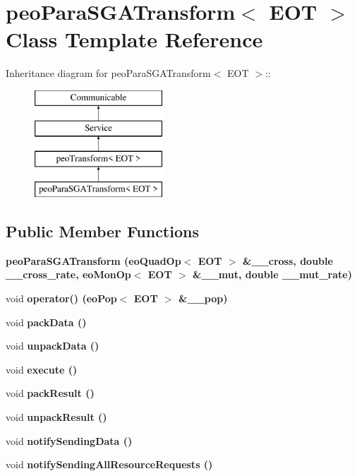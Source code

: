 \section{peo\-Para\-SGATransform$<$ EOT $>$ Class Template Reference}
\label{classpeo_para_s_g_a_transform}
Inheritance diagram for peo\-Para\-SGATransform$<$ EOT $>$::\begin{figure}[H]
\begin{center}
\leavevmode
\includegraphics[height=4cm]{classpeo_para_s_g_a_transform}
\end{center}
\end{figure}
\subsection*{Public Member Functions}
\begin{CompactItemize}
\item 
\bf{peo\-Para\-SGATransform} (eo\-Quad\-Op$<$ EOT $>$ \&\_\-\_\-cross, double \_\-\_\-cross\_\-rate, eo\-Mon\-Op$<$ EOT $>$ \&\_\-\_\-mut, double \_\-\_\-mut\_\-rate)\label{classpeo_para_s_g_a_transform_2052bca82fbbfe5455bf6f69246d4dbf}

\item 
void \bf{operator()} (eo\-Pop$<$ EOT $>$ \&\_\-\_\-pop)\label{classpeo_para_s_g_a_transform_669de7f7c6316fa745a15b909efb6527}

\item 
void \bf{pack\-Data} ()\label{classpeo_para_s_g_a_transform_fd278bcde58d29c9a343d5cbead81a1e}

\item 
void \bf{unpack\-Data} ()\label{classpeo_para_s_g_a_transform_a43a487a6e81791c8bbf6ce30f4336ab}

\item 
void \bf{execute} ()\label{classpeo_para_s_g_a_transform_c9de2100fb897177a401c634002f6dd9}

\item 
void \bf{pack\-Result} ()\label{classpeo_para_s_g_a_transform_ba08e224ceaa4149e8e1a88694a2ccf2}

\item 
void \bf{unpack\-Result} ()\label{classpeo_para_s_g_a_transform_257663dcdc6cc95b6183d472ffba1b2f}

\item 
void \bf{notify\-Sending\-Data} ()\label{classpeo_para_s_g_a_transform_4e19dfc22b6f69fa8b93537226551866}

\item 
void \bf{notify\-Sending\-All\-Resource\-Requests} ()\label{classpeo_para_s_g_a_transform_8a0316e33897c395a81787f59ea7a1c8}

\end{CompactItemize}
